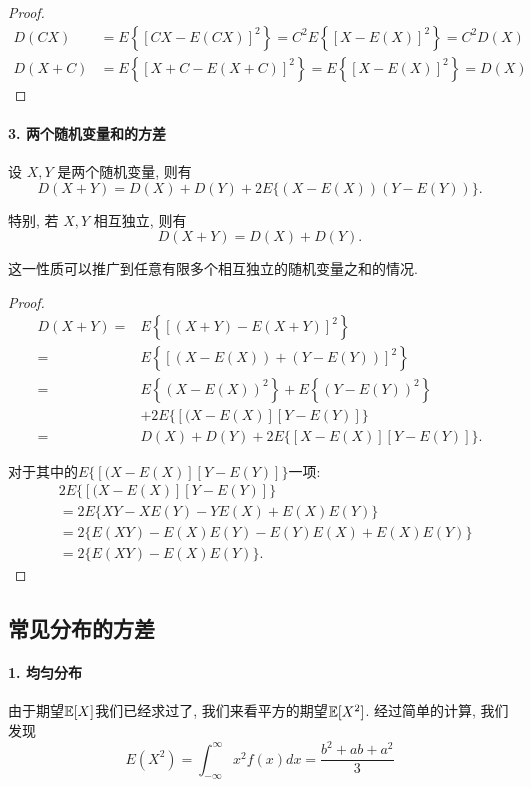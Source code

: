    \begin{proof}
    
    $$
\begin{aligned}
D(C X) & =E\left\{[C X-E(C X)]^2\right\}=C^2 E\left\{[X-E(X)]^2\right\}=C^2 D(X) \\
D(X+C) & =E\left\{[X+C-E(X+C)]^2\right\}=E\left\{[X-E(X)]^2\right\}=D(X)
\end{aligned}
$$
   \end{proof}

   \paragraph{3. 两个随机变量和的方差} 设 $X, Y$ 是两个随机变量, 则有
   $$
   D(X+Y)=D(X)+D(Y)+2 E\{(X-E(X))(Y-E(Y))\} .
   $$
   
   特别, 若 $X, Y$ 相互独立, 则有
   $$
   D(X+Y)=D(X)+D(Y) .
   $$
   
   这一性质可以推广到任意有限多个相互独立的随机变量之和的情况.

   \begin{proof}
    $$
\begin{aligned}
D(X+Y)= & E\left\{[(X+Y)-E(X+Y)]^2\right\} \\
= & E\left\{[(X-E(X))+(Y-E(Y))]^2\right\} \\
= & E\left\{(X-E(X))^2\right\}+E\left\{(Y-E(Y))^2\right\} \\
& +2 E\{[(X-E(X)][Y-E(Y)]\} \\
= & D(X)+D(Y)+2 E\{[X-E(X)][Y-E(Y)]\} .
\end{aligned}
$$

对于其中的$ E\{[(X-E(X)][Y-E(Y)]\}$一项: $$
\begin{aligned}
& 2 E\{[(X-E(X)][Y-E(Y)]\} \\
& =2 E\{X Y-X E(Y)-Y E(X)+E(X) E(Y)\} \\
& =2\{E(X Y)-E(X) E(Y)-E(Y) E(X)+E(X) E(Y)\} \\
& =2\{E(X Y)-E(X) E(Y)\} .
\end{aligned}
$$
   \end{proof}

   

    \subsection{常见分布的方差}
    \paragraph{1. 均匀分布} 由于期望$\mathbb E[X]$我们已经求过了, 我们来看平方的期望$\mathbb E[X^2]$. 经过简单的计算, 我们发现$$
    E\left(X^2\right)=\int_{-\infty}^{\infty} x^2 f(x) d x=\frac{b^2+a b+a^2}{3}
    $$
    
